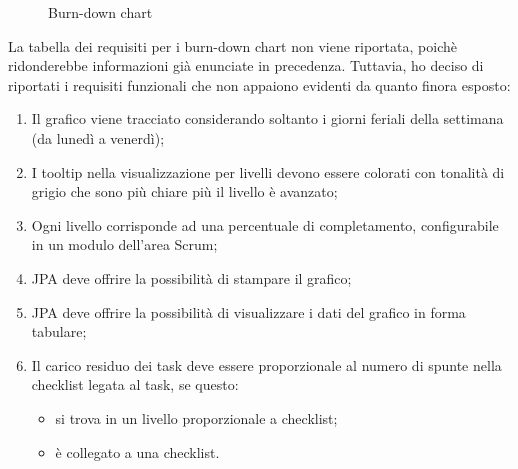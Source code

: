 \begin{figure}[H]
  \vspace*{\fill}
  \caption{Burn-down chart}
  \label{fig:bdchart}
\end{figure}

La tabella dei requisiti per i burn-down chart non viene riportata, poichè
ridonderebbe informazioni già enunciate in precedenza. Tuttavia, ho deciso di
riportati i requisiti funzionali che non appaiono evidenti da quanto finora
esposto:

\begin{enumerate}
\item Il grafico viene tracciato considerando soltanto i giorni feriali della
  settimana (da lunedì a venerdì);
\item I tooltip nella visualizzazione per livelli devono essere colorati con
  tonalità di grigio che sono più chiare più il livello è avanzato;
\item Ogni livello corrisponde ad una percentuale di completamento,
  configurabile in un modulo dell'area Scrum;
\item JPA deve offrire la possibilità di stampare il grafico;
\item JPA deve offrire la possibilità di visualizzare i dati del grafico in
  forma tabulare;
\item Il carico residuo dei task deve essere proporzionale al numero di spunte
  nella checklist legata al task, se questo:
  \begin{itemize}
  \item si trova in un livello proporzionale a checklist;
  \item è collegato a una checklist.
  \end{itemize}
\end{enumerate}

